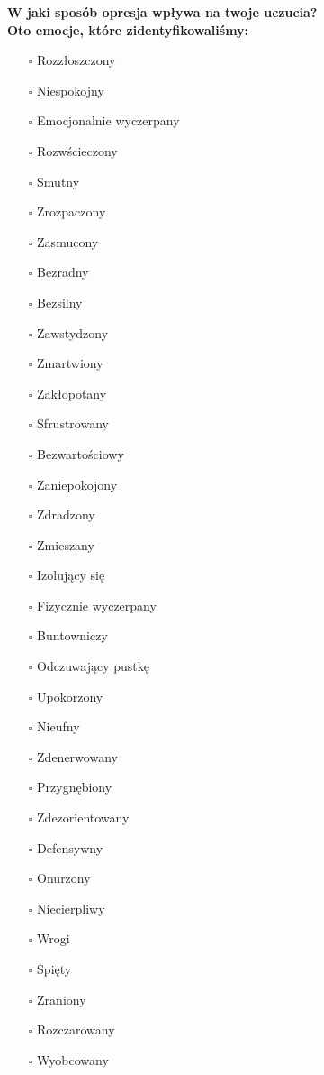\noindent\textcolor{ProcessBlue}{\textbf{\Large{W jaki sposób opresja wpływa na twoje uczucia?}}}\\
\large{\textbf{Oto emocje, które zidentyfikowaliśmy:}}
\begin{multicols}{3}
\begin{itemize}
\item[$\square$]{Rozzłoszczony}
\item[$\square$]{Niespokojny}
\item[$\square$]{Emocjonalnie wyczerpany}
\item[$\square$]{Rozwścieczony}
\item[$\square$]{Smutny}
\item[$\square$]{Zrozpaczony}
\item[$\square$]{Zasmucony}
\item[$\square$]{Bezradny}
\item[$\square$]{Bezsilny}
\item[$\square$]{Zawstydzony}
\item[$\square$]{Zmartwiony}
\item[$\square$]{Zakłopotany}
\item[$\square$]{Sfrustrowany}
\item[$\square$]{Bezwartościowy}
\item[$\square$]{Zaniepokojony}
\item[$\square$]{Zdradzony}
\item[$\square$]{Zmieszany}
\item[$\square$]{Izolujący się}
\item[$\square$]{Fizycznie wyczerpany}
\item[$\square$]{Buntowniczy}
\item[$\square$]{Odczuwający pustkę}
\item[$\square$]{Upokorzony}
\item[$\square$]{Nieufny}
\item[$\square$]{Zdenerwowany}
\item[$\square$]{Przygnębiony}
\item[$\square$]{Zdezorientowany}
\item[$\square$]{Defensywny}
\item[$\square$]{Onurzony}
\item[$\square$]{Niecierpliwy}
\item[$\square$]{Wrogi}
\item[$\square$]{Spięty}
\item[$\square$]{Zraniony}
\item[$\square$]{Rozczarowany}
\item[$\square$]{Wyobcowany}
\end{itemize}
\end{multicols}


